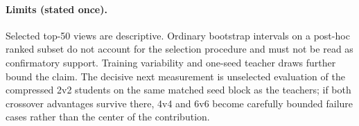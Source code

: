 \paragraph{Limits (stated once).}
Selected top-50 views are descriptive. Ordinary bootstrap intervals on a
post-hoc ranked subset do not account for the selection procedure and must
not be read as confirmatory support. Training variability and one-seed
teacher draws further bound the claim. The decisive next measurement is
unselected evaluation of the compressed 2v2 students on the same matched
seed block as the teachers; if both crossover advantages survive there,
4v4 and 6v6 become carefully bounded failure cases rather than the center of
the contribution.
